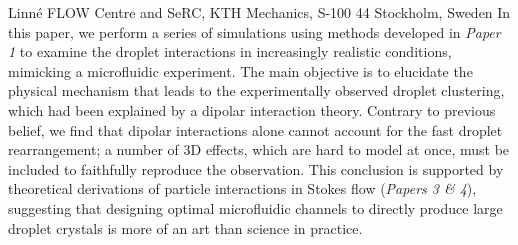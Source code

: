 %
%
%
%
%
%
%
\paperaffiliation
{%
  Linn\'e FLOW Centre and SeRC, KTH Mechanics, S-100 44 Stockholm, Sweden%
}%
%
%
%
%
%
\papernumber{}%
%
%
%
%
%
\papersummary%
{%
In this paper, we perform a series of simulations using methods developed in \emph{Paper 1}
to examine the droplet interactions in increasingly realistic conditions, mimicking a microfluidic experiment.
The main objective is to elucidate the physical mechanism that leads to the experimentally observed droplet clustering,
which had been explained by a dipolar interaction theory.
Contrary to previous belief, we find that dipolar interactions alone cannot account for the fast droplet rearrangement;
a number of 3D effects, which are hard to model at once, must be included to faithfully reproduce the observation.
This conclusion is supported by theoretical derivations of particle interactions in Stokes flow (\emph{Papers 3 \& 4}),
suggesting that designing optimal microfluidic channels to directly produce large droplet crystals is more of an art than science in practice.
}%
%
\graphicspath{{paper2/}}%
%
%
%
